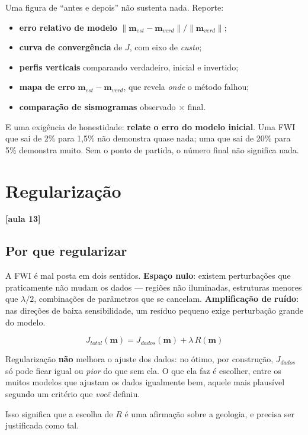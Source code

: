 \documentclass[11pt,a4paper,oneside]{report}
\newcommand{\aula}[1]{\textcolor{cianofwi}{\textbf{[aula #1]}}}
\begin{document}
\begin{teoria}
Uma figura de ``antes e depois'' não sustenta nada. Reporte:
\begin{itemize}[leftmargin=*]
\item \textbf{erro relativo de modelo} $\|\mathbf{m}_{est}-\mathbf{m}_{verd}\|/\|\mathbf{m}_{verd}\|$;
\item \textbf{curva de convergência} de $J$, com eixo de \emph{custo};
\item \textbf{perfis verticais} comparando verdadeiro, inicial e invertido;
\item \textbf{mapa de erro} $\mathbf{m}_{est}-\mathbf{m}_{verd}$, que revela
\emph{onde} o método falhou;
\item \textbf{comparação de sismogramas} observado $\times$ final.
\end{itemize}

E uma exigência de honestidade: \textbf{relate o erro do modelo inicial}. Uma
FWI que sai de 2\% para 1{,}5\% não demonstra quase nada; uma que sai de 20\%
para 5\% demonstra muito. Sem o ponto de partida, o número final não
significa nada.
\end{teoria}

\chapter{Regularização}
\label{cap:regularizacao}

\aula{13}

\section{Por que regularizar}

A FWI é mal posta em dois sentidos. \textbf{Espaço nulo}: existem perturbações
que praticamente não mudam os dados --- regiões não iluminadas, estruturas
menores que $\lambda/2$, combinações de parâmetros que se cancelam.
\textbf{Amplificação de ruído}: nas direções de baixa sensibilidade, um
resíduo pequeno exige perturbação grande do modelo.

\begin{equation}
J_{total}(\mathbf{m}) = J_{dados}(\mathbf{m}) + \lambda\,R(\mathbf{m})
\end{equation}

\begin{atencao}
Regularização \textbf{não} melhora o ajuste dos dados: no ótimo, por
construção, $J_{dados}$ só pode ficar igual ou \emph{pior} do que sem ela. O
que ela faz é escolher, entre os muitos modelos
que ajustam os dados igualmente bem, aquele mais plausível segundo um critério
que \emph{você} definiu.

Isso significa que a escolha de $R$ é uma afirmação sobre a geologia, e
precisa ser justificada como tal.
\end{atencao}
\end{document}
